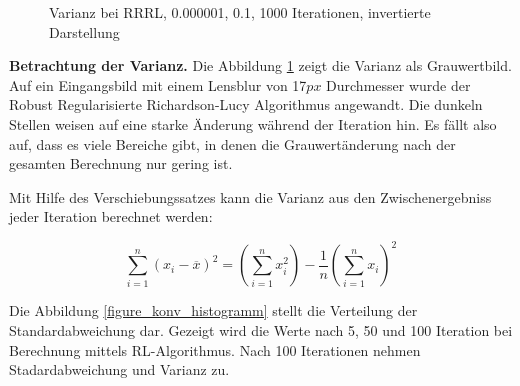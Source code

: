 \documentclass[a4paper,12pt]{article}
\begin{document}
\begin{figure}[htbp]
\caption{Varianz bei RRRL, 0.000001, 0.1, 1000 Iterationen, invertierte
Darstellung}%
\label{figure_konver_altes_bild}
\end{figure}

\textbf{Betrachtung der Varianz.} 
Die Abbildung \ref{figure_konver_altes_bild}
zeigt die Varianz als Grauwertbild. Auf ein Eingangsbild mit einem Lensblur von
17$px$ Durchmesser wurde der Robust Regularisierte Richardson-Lucy Algorithmus
angewandt. Die dunkeln Stellen weisen auf eine starke Änderung während der
Iteration hin. Es fällt also auf, dass es viele Bereiche gibt, in denen die
Grauwertänderung nach der gesamten Berechnung nur gering ist. 

Mit Hilfe des Verschiebungssatzes kann die Varianz aus den Zwischenergebniss
jeder Iteration berechnet werden:

\begin{equation} \label{eq:verschiebungssatz}
\sum_{i=1}^{n} (x_i - \overline{x})^2 = \left(  \sum_{i=1}^{n} x_i^2 \right ) -
\frac{1}{n} \left ( \sum_{i=1}^{n} x_i \right ) ^2
\end{equation}

Die Abbildung \ref{figure_konv_histogramm} stellt die Verteilung der
Standardabweichung dar.
Gezeigt wird die Werte nach 5, 50 und 100 Iteration bei Berechnung mittels
RL-Algorithmus. Nach 100 Iterationen nehmen Stadardabweichung und Varianz zu.
\end{document}
